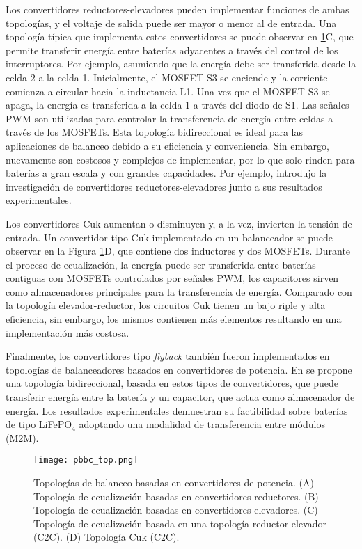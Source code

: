 Los convertidores reductores-elevadores pueden implementar funciones de ambas
topolog\'ias, y el voltaje de salida puede ser mayor o menor al de entrada. Una
topolog\'ia t\'ipica que implementa estos convertidores se puede observar en
\ref{pbbc_top}C, que permite transferir energ\'ia entre bater\'ias adyacentes a
trav\'es del control de los interruptores. Por ejemplo, asumiendo que la
energ\'ia debe ser transferida desde la celda 2 a la celda 1. Inicialmente, el
MOSFET S3 se enciende y la corriente comienza a circular hacia la inductancia
L1. Una vez que el MOSFET S3 se apaga, la energ\'ia es transferida a la celda 1
a trav\'es del diodo de S1. Las señales \acrshort{PWM} son utilizadas para
controlar la transferencia de energ\'ia entre celdas a trav\'es de los MOSFETs.
Esta topolog\'ia bidireccional es ideal para las aplicaciones de balanceo debido
a su eficiencia y conveniencia. Sin embargo, nuevamente son costosos y complejos
de implementar, por lo que solo rinden para bater\'ias a gran escala y con
grandes capacidades. Por ejemplo, \cite{shang_et_al_bal_rect} introdujo la 
investigaci\'on de convertidores reductores-elevadores junto a sus resultados 
experimentales.
         
Los convertidores Cuk aumentan o disminuyen y, a la vez, invierten la tensi\'on
de entrada. Un convertidor tipo Cuk implementado en un balanceador se puede
observar en la Figura \ref{pbbc_top}D, que contiene dos inductores y dos
MOSFETs. Durante el proceso de ecualizaci\'on, la energ\'ia puede ser
transferida entre bater\'ias contiguas con MOSFETs controlados por señales
\acrshort{PWM}, los capacitores sirven como almacenadores principales para la
transferencia de energ\'ia. Comparado con la topolog\'ia elevador-reductor, los
circuitos Cuk tienen un bajo riple y alta eficiencia, sin embargo, los mismos
contienen m\'as elementos resultando en una implementaci\'on m\'as costosa.

Finalmente, los convertidores tipo \emph{flyback} tambi\'en fueron implementados
en topolog\'ias de balanceadores basados en convertidores de potencia. En
\cite{lin_et_al_bal_bid} se propone una topolog\'ia bidireccional, basada en 
estos tipos de convertidores, que puede transferir energ\'ia entre la bater\'ia y 
un capacitor, que actua como almacenador de energ\'ia. Los resultados 
experimentales demuestran su factibilidad sobre bater\'ias de tipo 
LiFeP$\mathrm{O_4}$ adoptando una modalidad de transferencia entre m\'odulos 
(\acrshort{M2M}).

\begin{figure}[h!]
    \begin{center}
        \texttt{[image: pbbc\_top.png]}
        \caption{Topolog\'ias de balanceo basadas en convertidores de potencia.
                 (A) Topolog\'ia de ecualizaci\'on basadas en convertidores
                 reductores. (B) Topolog\'ia de ecualizaci\'on basadas en
                 convertidores elevadores. (C) Topolog\'ia de ecualizaci\'on
                 basada en una topolog\'ia reductor-elevador (\acrshort{C2C}).
                 (D) Topolog\'ia Cuk (\acrshort{C2C}).}
         \label{pbbc_top}
    \end{center}
\end{figure}
\FloatBarrier

